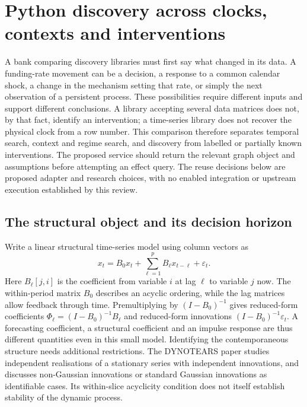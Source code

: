 \section{Python discovery across clocks, contexts and interventions}
\label{exec14:python-temporal}

A bank comparing discovery libraries must first say what changed in its data.
A funding-rate movement can be a decision, a response to a common calendar
shock, a change in the mechanism setting that rate, or simply the next
observation of a persistent process. These possibilities require different
inputs and support different conclusions. A library accepting several data
matrices does not, by that fact, identify an intervention; a time-series
library does not recover the physical clock from a row number. This comparison
therefore separates temporal search, context and regime search, and discovery
from labelled or partially known interventions. The proposed service should
return the relevant graph object and assumptions before attempting an effect
query. The reuse decisions below are proposed adapter and research choices,
with no enabled integration or upstream execution established by this review.
\citep{exec14_pt_contract}

\subsection{The structural object and its decision horizon}

Write a linear structural time-series model using column vectors as
\[
 x_t=B_0x_t+\sum_{\ell=1}^{p}B_\ell x_{t-\ell}+\varepsilon_t.
\]
Here $B_\ell[j,i]$ is the coefficient from variable $i$ at lag $\ell$ to
variable $j$ now. The within-period matrix $B_0$ describes an acyclic ordering,
while the lag matrices allow feedback through time. Premultiplying by
$(I-B_0)^{-1}$ gives reduced-form coefficients
$\Phi_\ell=(I-B_0)^{-1}B_\ell$ and reduced-form innovations
$(I-B_0)^{-1}\varepsilon_t$. A forecasting coefficient, a structural
coefficient and an impulse response are thus different quantities even in
this small model. Identifying the contemporaneous structure needs additional
restrictions. The DYNOTEARS paper studies independent realisations of a
stationary series with independent innovations, and discusses non-Gaussian
innovations or standard Gaussian innovations as identifiable cases. Its
within-slice acyclicity condition does not itself establish stability of the
dynamic process.\citep{exec14_pt_paper_dynotears}

